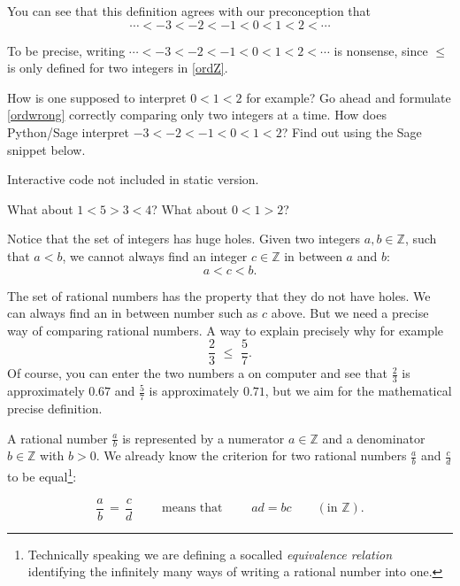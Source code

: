You can
see that this definition agrees with our preconception that
\begin{equation}\label{ordwrong}
  \cdots < -3 < -2 < -1 < 0 < 1 < 2 < \cdots
\end{equation}

To be precise, writing $\cdots < -3 < -2 < -1 < 0 < 1 < 2 < \cdots$ is nonsense, since $\leq$ is only defined for two integers in \eqref{ordZ}.

\begin{tcolorbox}\begin{exercise}
    How is one supposed to interpret $0 < 1 < 2$ for example? Go ahead and formulate \eqref{ordwrong} correctly comparing only two integers at a time.
    How does Python/Sage interpret $-3 < -2 < -1< 0 < 1 < 2$? Find out using the Sage snippet below.

    \begin{sage} Interactive code not included in static version.\end{sage}

    What about $1 < 5 > 3 < 4$? What about $0 < 1 > 2$?
  \end{exercise}\end{tcolorbox}

Notice that the set of integers has huge holes. Given two integers $a, b\in \mathbb{Z}$, such
that $a < b$, we cannot always find an integer $c\in \mathbb{Z}$ in between $a$ and $b$:
$$
  a < c < b.
$$

The set of rational numbers has the property that they do not have holes. We can
always find an in between number such as $c$ above. But we need a precise way
of comparing rational numbers. A way to explain precisely why for example
$$
  \frac{2}{3}\,\, \leq \,\, \frac{5}{7}.
$$
Of course, you can enter the two numbers a on computer and see that
$\frac{2}{3}$ is approximately $0.67$ and $\frac{5}{7}$
is approximately $0.71$, but we aim for the mathematical
precise definition.

A
rational number $\frac{a}{b}$ is represented by a numerator $a\in \mathbb{Z}$ and a denominator
$b\in \mathbb{Z}$ with $b > 0$. We already know the criterion for two rational numbers
$\frac{a}{b}$ and $\frac{c}{d}$
to be equal\footnote{Technically speaking we are defining a socalled \emph{equivalence relation} identifying the infinitely many ways of writing a rational number into one.}:

\begin{tcolorbox}\begin{equation*}
    \frac{a}{b}\, =\, \frac{c}{d}\qquad \text{ means that }\qquad a d = b c\qquad (\text{in }\mathbb{Z}).
  \end{equation*}\end{tcolorbox}

